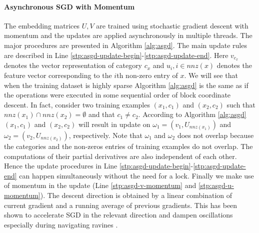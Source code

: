 \paragraph{Asynchronous SGD with Momentum}
The embedding matrices $U, V$ are trained using stochastic gradient descent with momentum and the updates are applied asynchronously in multiple threads. 
The major procedures are presented in Algorithm \ref{alg:asgd}. 
The main update rules are described in Line \ref{stp:asgd-update-begin}-\ref{stp:asgd-update-end}. 
Here $v_{c_x}$ denotes the vector representation of category $c_x$ and $u_i, i \in nnz(x)$ denotes the feature vector corresponding to the $i$th non-zero entry of $x$.
We will see that when the training dataset is highly sparse Algorithm \ref{alg:asgd} is the same as if the operations were executed in some sequential order of block coordinate descent. In fact, consider two training examples $(x_1, c_1)$ and $(x_2, c_2)$ such that $nnz(x_1) \cap nnz(x_2) = \emptyset$ and that $c_1 \neq c_2$. According to Algorithm \ref{alg:asgd} $(x_1, c_1)$ and $(x_2, c_2)$ will result in update on $\omega_1 = (v_1, U_{nnz(x_1)})$ and $\omega_2 = (v_2, U_{nnz(x_2)})$, respectively. Note that $\omega_1$ and $\omega_2$ does not overlap because the categories and the non-zeros entries of training examples do not overlap. The computations of their partial derivatives are also independent of each other. 
Hence the update procedures in Line \ref{stp:asgd-update-begin}-\ref{stp:asgd-update-end} can happen simultaneously without the need for a lock. 
Finally we make use of momentum in the update (Line \ref{stp:asgd-v-momentum} and \ref{stp:asgd-u-momentum}). The descent direction is obtained by a linear combination of current gradient and a running average of previous gradients. This has been shown to accelerate SGD in the relevant direction and dampen oscillations especially during navigating ravines \cite{rumelhart1988learning}.

